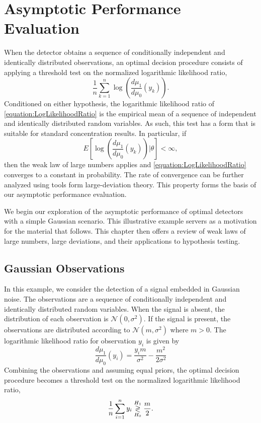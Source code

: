 
\section{Asymptotic Performance Evaluation}

When the detector obtains a sequence of conditionally independent and identically distributed observations, an optimal decision procedure consists of applying a threshold test on the normalized logarithmic likelihood ratio,
\begin{equation} \label{equation:LogLikelihoodRatio}
\frac{1}{n} \sum_{k=1}^n \log \left( \frac{d\mu_1}{d\mu_0}(y_k) \right) .
\end{equation}
Conditioned on either hypothesis, the logarithmic likelihood ratio of \eqref{equation:LogLikelihoodRatio} is the empirical mean of a sequence of independent and identically distributed random variables.
As such, this test has a form that is suitable for standard concentration results.
In particular, if
\begin{equation*}
E \left[ \log \left( \frac{d\mu_1}{d\mu_0}(y_k) \right) \Big| \theta \right] < \infty ,
\end{equation*}
then the weak law of large numbers applies and \eqref{equation:LogLikelihoodRatio} converges to a constant in probability.
The rate of convergence can be further analyzed using tools form large-deviation theory.
This property forms the basis of our asymptotic performance evaluation.

We begin our exploration of the asymptotic performance of optimal detectors with a simple Gaussian scenario.
This illustrative example servers as a motivation for the material that follows.
This chapter then offers a review of weak laws of large numbers, large deviations, and their applications to hypothesis testing.


\subsection{Gaussian Observations}

In this example, we consider the detection of a signal embedded in Gaussian noise.
The observations are a sequence of conditionally independent and identically distributed random variables.
When the signal is absent, the distribution of each observation is $\mathcal{N}(0,\sigma^2)$.
If the signal is present, the observations are distributed according to $\mathcal{N}(m,\sigma^2)$ where $m > 0$.
The logarithmic likelihood ratio for observation $y_i$ is given by
\begin{equation*}
\frac{d\mu_1}{d\mu_0} (y_i) = \frac{y_i m}{\sigma^2} - \frac{m^2}{2 \sigma^2}
\end{equation*}
Combining the observations and assuming equal priors, the optimal decision procedure becomes a threshold test on the normalized logarithmic likelihood ratio,
\begin{equation*}
\frac{1}{n} \sum_{i=1}^n y_i \overset{H_1}{ \underset{H_0}{\gtrless} } \frac{m}{2} .
\end{equation*}


